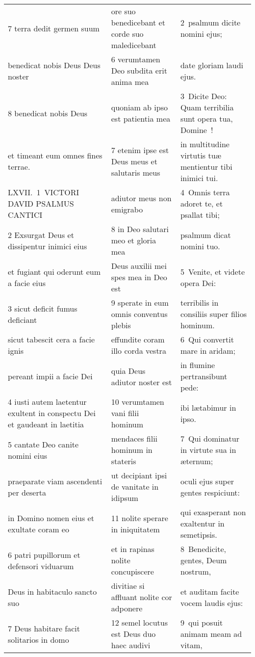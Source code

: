 \documentclass{article}
\begin{document}
\begin{longtable}{@{}p{}p{}p{}@{}}
7 terra dedit germen suum	&	ore suo benedicebant et corde suo maledicebant	&	2 psalmum dicite nomini ejus;	\\
benedicat nobis Deus Deus noster	&	6 verumtamen Deo subdita erit anima mea	&	date gloriam laudi ejus.	\\
8 benedicat nobis Deus	&	quoniam ab ipso est patientia mea	&	3 Dicite Deo: Quam terribilia sunt opera tua, Domine !	\\
et timeant eum omnes fines terrae.	&	7 etenim ipse est Deus meus et salutaris meus	&	in multitudine virtutis tuæ mentientur tibi inimici tui.	\\
LXVII. 1 VICTORI DAVID PSALMUS CANTICI	&	adiutor meus non emigrabo	&	4 Omnis terra adoret te, et psallat tibi;	\\
2 Exsurgat Deus et dissipentur inimici eius	&	8 in Deo salutari meo et gloria mea	&	psalmum dicat nomini tuo.	\\
et fugiant qui oderunt eum a facie eius	&	Deus auxilii mei spes mea in Deo est	&	5 Venite, et videte opera Dei:	\\
3 sicut deficit fumus deficiant	&	9 sperate in eum omnis conventus plebis	&	terribilis in consiliis super filios hominum.	\\
sicut tabescit cera a facie ignis	&	effundite coram illo corda vestra	&	6 Qui convertit mare in aridam;	\\
pereant impii a facie Dei	&	quia Deus adiutor noster est	&	in flumine pertransibunt pede:	\\
4 iusti autem laetentur exultent in conspectu Dei et gaudeant in laetitia	&	10 verumtamen vani filii hominum	&	ibi lætabimur in ipso.	\\
5 cantate Deo canite nomini eius	&	mendaces filii hominum in stateris	&	7 Qui dominatur in virtute sua in æternum;	\\
praeparate viam ascendenti per deserta	&	ut decipiant ipsi de vanitate in idipsum	&	oculi ejus super gentes respiciunt:	\\
in Domino nomen eius et exultate coram eo	&	11 nolite sperare in iniquitatem	&	qui exasperant non exaltentur in semetipsis.	\\
6 patri pupillorum et defensori viduarum	&	et in rapinas nolite concupiscere	&	8 Benedicite, gentes, Deum nostrum,	\\
Deus in habitaculo sancto suo	&	divitiae si affluant nolite cor adponere	&	et auditam facite vocem laudis ejus:	\\
7 Deus habitare facit solitarios in domo	&	12 semel locutus est Deus duo haec audivi	&	9 qui posuit animam meam ad vitam,	\\

\end{longtable}
\end{document}
